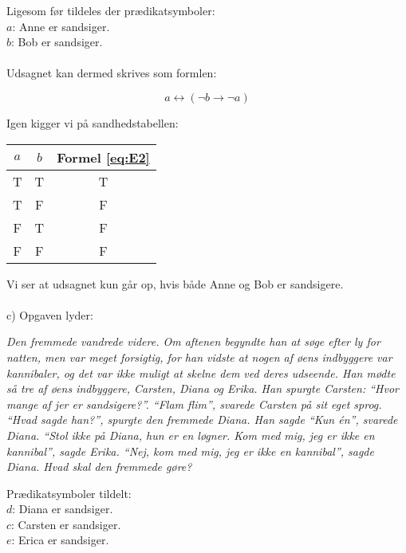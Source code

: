 Ligesom før tildeles der prædikatsymboler:\\
$a$: Anne er sandsiger. \\
$b$: Bob er sandsiger. \\
\\

Udsagnet kan dermed skrives som formlen: 

\begin{equation}
a \leftrightarrow (\neg b \rightarrow \neg a)
\label{eq:E2}
\end{equation}

Igen kigger vi på sandhedstabellen:

\begin{table}[H]
\centering
\begin{tabular}{c|c|c}
$a$ & $b$ & Formel \eqref{eq:E2} \\ \hline
T & T & T  \\
T & F & F  \\
F & T & F  \\
F & F & F 
\end{tabular}
\end{table}

Vi ser at udsagnet kun går op, hvis både Anne og Bob er sandsigere.\\
\\

c) Opgaven lyder:

\begin{center}
\textit{Den fremmede vandrede videre. Om aftenen begyndte han at søge efter ly for natten, men var meget forsigtig, for han vidste at nogen af øens indbyggere var kannibaler, og det var ikke muligt at skelne dem ved deres udseende. Han mødte så tre af øens indbyggere, Carsten, Diana og Erika. Han spurgte Carsten: “Hvor mange af jer er sandsigere?”. “Flam flim”, svarede Carsten på sit eget sprog. “Hvad sagde han?”, spurgte den fremmede Diana. Han sagde “Kun én”, svarede Diana. “Stol ikke på Diana, hun er en løgner. Kom med mig, jeg er ikke en kannibal”, sagde Erika. “Nej, kom med mig, jeg er ikke en kannibal”, sagde Diana. Hvad skal den fremmede gøre?}
\end{center}

Prædikatsymboler tildelt: \\
$d$: Diana er sandsiger. \\
$c$: Carsten er sandsiger.\\
$e$: Erica er sandsiger.\\
\\

